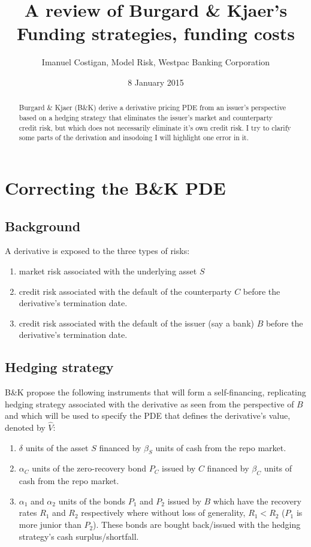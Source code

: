 \documentclass{tufte-handout}
\title{A review of Burgard \& Kjaer's Funding strategies, funding costs}
\author{Imanuel Costigan, Model Risk, Westpac Banking Corporation}
\date{8 January 2015}  %
\begin{document}
\maketitle%

\begin{abstract}
\noindent Burgard \& Kjaer (B\&K) \cite{bkfunding2013up} derive a derivative
pricing PDE from an issuer's perspective based on a hedging strategy that
eliminates the issuer's market and counterparty credit risk, but which does not
necessarily eliminate it's own credit risk. I try to clarify some parts of the
derivation and insodoing I will highlight one error in it.
\end{abstract}

\section{Correcting the B\&K PDE}\label{sec:correction}

\subsection{Background}

A derivative is exposed to the three types of risks:

\begin{enumerate}
\item market risk associated with the underlying asset $S$
\item credit risk associated with the default of the counterparty $C$ before the
derivative's termination date.
\item credit risk associated with the default of the issuer (say a bank) $B$
before the derivative's termination date.
\end{enumerate}

\subsection{Hedging strategy}\label{sec:dynhedging}

B\&K propose the following instruments that will form a
self-financing, replicating hedging strategy associated with the
derivative as seen from the perspective of $B$ and which will be used to
specify the PDE that defines the derivative's value, denoted by $\hat{V}$:

\begin{enumerate}
\item $\delta$ units of the asset $S$ financed by $\beta_S$ units of cash
from the repo market.
\item $\alpha_C$ units of the zero-recovery bond $P_C$ issued by $C$ financed
by $\beta_C$ units of cash from the repo market.
\item $\alpha_1$ and $\alpha_2$ units of the bonds $P_1$ and $P_2$ issued
by $B$ which have the recovery rates $R_1$ and $R_2$ respectively where
without loss of generality, $R_1 < R_2$ ($P_1$ is more junior than $P_2$).
These bonds are bought back/issued with the hedging strategy's cash
surplus/shortfall.
\end{enumerate}
\end{document}
